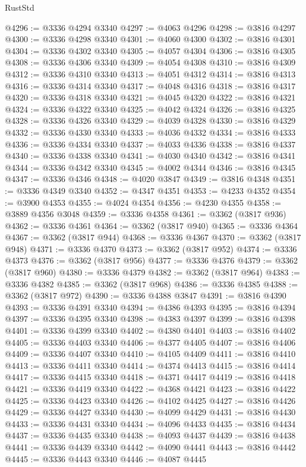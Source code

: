 \begin{lexlean}{RustStd}
\begin{coremodule}
@4296 := @3336 @4294 @3340
@4297 := @4063 @4296
@4298 := @3816 @4297
@4300 := @3336 @4298 @3340
@4301 := @4060 @4300
@4302 := @3816 @4301
@4304 := @3336 @4302 @3340
@4305 := @4057 @4304
@4306 := @3816 @4305
@4308 := @3336 @4306 @3340
@4309 := @4054 @4308
@4310 := @3816 @4309
@4312 := @3336 @4310 @3340
@4313 := @4051 @4312
@4314 := @3816 @4313
@4316 := @3336 @4314 @3340
@4317 := @4048 @4316
@4318 := @3816 @4317
@4320 := @3336 @4318 @3340
@4321 := @4045 @4320
@4322 := @3816 @4321
@4324 := @3336 @4322 @3340
@4325 := @4042 @4324
@4326 := @3816 @4325
@4328 := @3336 @4326 @3340
@4329 := @4039 @4328
@4330 := @3816 @4329
@4332 := @3336 @4330 @3340
@4333 := @4036 @4332
@4334 := @3816 @4333
@4336 := @3336 @4334 @3340
@4337 := @4033 @4336
@4338 := @3816 @4337
@4340 := @3336 @4338 @3340
@4341 := @4030 @4340
@4342 := @3816 @4341
@4344 := @3336 @4342 @3340
@4345 := @4002 @4344
@4346 := @3816 @4345
@4347 := @3336 @4346
@4348 := @4020 @3847
@4349 := @3816 @4348
@4351 := @3336 @4349 @3340
@4352 := @4347 @4351
@4353 := @4233 @4352
@4354 := @3900 @4353
@4355 := @4024 @4354
@4356 := @4230 @4355
@4358 := @3889 @4356 @3048
@4359 := @3336 @4358
@4361 := @3362 (@3817 @936)
@4362 := @3336 @4361
@4364 := @3362 (@3817 @940)
@4365 := @3336 @4364
@4367 := @3362 (@3817 @944)
@4368 := @3336 @4367
@4370 := @3362 (@3817 @948)
@4371 := @3336 @4370
@4373 := @3362 (@3817 @952)
@4374 := @3336 @4373
@4376 := @3362 (@3817 @956)
@4377 := @3336 @4376
@4379 := @3362 (@3817 @960)
@4380 := @3336 @4379
@4382 := @3362 (@3817 @964)
@4383 := @3336 @4382
@4385 := @3362 (@3817 @968)
@4386 := @3336 @4385
@4388 := @3362 (@3817 @972)
@4390 := @3336 @4388 @3847
@4391 := @3816 @4390
@4393 := @3336 @4391 @3340
@4394 := @4386 @4393
@4395 := @3816 @4394
@4397 := @3336 @4395 @3340
@4398 := @4383 @4397
@4399 := @3816 @4398
@4401 := @3336 @4399 @3340
@4402 := @4380 @4401
@4403 := @3816 @4402
@4405 := @3336 @4403 @3340
@4406 := @4377 @4405
@4407 := @3816 @4406
@4409 := @3336 @4407 @3340
@4410 := @4105 @4409
@4411 := @3816 @4410
@4413 := @3336 @4411 @3340
@4414 := @4374 @4413
@4415 := @3816 @4414
@4417 := @3336 @4415 @3340
@4418 := @4371 @4417
@4419 := @3816 @4418
@4421 := @3336 @4419 @3340
@4422 := @4368 @4421
@4423 := @3816 @4422
@4425 := @3336 @4423 @3340
@4426 := @4102 @4425
@4427 := @3816 @4426
@4429 := @3336 @4427 @3340
@4430 := @4099 @4429
@4431 := @3816 @4430
@4433 := @3336 @4431 @3340
@4434 := @4096 @4433
@4435 := @3816 @4434
@4437 := @3336 @4435 @3340
@4438 := @4093 @4437
@4439 := @3816 @4438
@4441 := @3336 @4439 @3340
@4442 := @4090 @4441
@4443 := @3816 @4442
@4445 := @3336 @4443 @3340
@4446 := @4087 @4445

\end{coremodule}
\end{lexlean}
